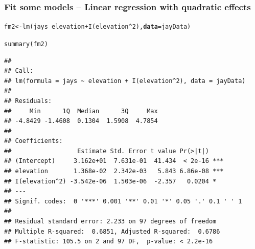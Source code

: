 \documentclass[color=usenames,dvipsnames]{beamer}\usepackage[]{graphicx}\usepackage[]{color}
\makeatletter
\newcommand{\hlnum}[1]{\textcolor[rgb]{0.69,0.494,0}{#1}}%
\newcommand{\hlopt}[1]{\textcolor[rgb]{0,0,0}{#1}}%
\newcommand{\hlstd}[1]{\textcolor[rgb]{0,0,0}{#1}}%
\newcommand{\hlkwb}[1]{\textcolor[rgb]{0,0.341,0.682}{#1}}%
\newcommand{\hlkwc}[1]{\textcolor[rgb]{0,0,0}{\textbf{#1}}}%
\newcommand{\hlkwd}[1]{\textcolor[rgb]{0.004,0.004,0.506}{#1}}%
\newenvironment{kframe}{%
 \def\at@end@of@kframe{}%
 \ifinner\ifhmode%
  \def\at@end@of@kframe{\end{minipage}}%
  \begin{minipage}{\columnwidth}%
 \fi\fi%
 \def\FrameCommand##1{\hskip\@totalleftmargin \hskip-\fboxsep
 \colorbox{shadecolor}{##1}\hskip-\fboxsep
     \hskip-\linewidth \hskip-\@totalleftmargin \hskip\columnwidth}%
 \MakeFramed {\advance\hsize-\width
   \@totalleftmargin\z@ \linewidth\hsize
   \@setminipage}}%
 {\par\unskip\endMakeFramed%
 \at@end@of@kframe}
\newenvironment{knitrout}{}{} %
\makeatother
\begin{document}
\begin{frame}[fragile]
  \frametitle{\normalsize Fit some models -- Linear regression with quadratic effects}
  \scriptsize
\begin{knitrout}\scriptsize
{}\color{fgcolor}\begin{kframe}
\begin{alltt}
\hlstd{fm2} \hlkwb{<-} \hlkwd{lm}\hlstd{(jays} \hlopt{~} \hlstd{elevation} \hlopt{+} \hlkwd{I}\hlstd{(elevation}\hlopt{^}\hlnum{2}\hlstd{),} \hlkwc{data}\hlstd{=jayData)}
\end{alltt}
\end{kframe}
\end{knitrout}
\pause
\begin{knitrout}\scriptsize
{}\color{fgcolor}\begin{kframe}
\begin{alltt}
\hlkwd{summary}\hlstd{(fm2)}
\end{alltt}
\begin{verbatim}
## 
## Call:
## lm(formula = jays ~ elevation + I(elevation^2), data = jayData)
## 
## Residuals:
##     Min      1Q  Median      3Q     Max 
## -4.8429 -1.4608  0.1304  1.5908  4.7854 
## 
## Coefficients:
##                  Estimate Std. Error t value Pr(>|t|)    
## (Intercept)     3.162e+01  7.631e-01  41.434  < 2e-16 ***
## elevation       1.368e-02  2.342e-03   5.843 6.86e-08 ***
## I(elevation^2) -3.542e-06  1.503e-06  -2.357   0.0204 *  
## ---
## Signif. codes:  0 '***' 0.001 '**' 0.01 '*' 0.05 '.' 0.1 ' ' 1
## 
## Residual standard error: 2.233 on 97 degrees of freedom
## Multiple R-squared:  0.6851,	Adjusted R-squared:  0.6786 
## F-statistic: 105.5 on 2 and 97 DF,  p-value: < 2.2e-16
\end{verbatim}
\end{kframe}
\end{knitrout}
\end{frame}
\end{document}
